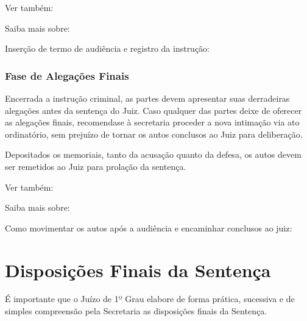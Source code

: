 \documentclass[letterpaper,10pt,brazil]{sphinxmanual}
\begin{document}
\begin{sphinxseealso}{Ver também:}

\sphinxAtStartPar
Saiba mais sobre:

\sphinxAtStartPar
Inserção de termo de audiência e registro da instrução: {\hyperref[\detokenize{projud_47_movimentacaoaudiencia::doc}]{}}


\end{sphinxseealso}



\subsubsection{Fase de Alegações Finais}
\label{\detokenize{07termoAIJ:fase-de-alegacoes-finais}}
\sphinxAtStartPar
Encerrada a instrução criminal, as partes devem apresentar suas derradeiras alegações antes da sentença do Juiz.
Caso qualquer das partes deixe de oferecer as alegações finais, recomenda\sphinxhyphen{}se à secretaria proceder a nova intimação via ato ordinatório, sem prejuízo de tornar os autos conclusos ao Juiz para deliberação.

\sphinxAtStartPar
Depositados os memoriais, tanto da acusação quanto da defesa, os autos devem ser remetidos ao Juiz para prolação da sentença.


\begin{sphinxseealso}{Ver também:}

\sphinxAtStartPar
Saiba mais sobre:

\sphinxAtStartPar
Como movimentar os autos após a audiência e encaminhar conclusos ao juiz: {\hyperref[\detokenize{projud_35_enviarconcluso::doc}]{}}


\end{sphinxseealso}


\sphinxstepscope


\section{Disposições Finais da Sentença}
\label{\detokenize{08sentenca_disposicoesfinais:disposicoes-finais-da-sentenca}}\label{\detokenize{08sentenca_disposicoesfinais::doc}}
\sphinxAtStartPar
É importante que o Juízo de 1º Grau elabore de forma prática, sucessiva e de simples compreensão pela Secretaria as disposições finais da Sentença.
\end{document}
